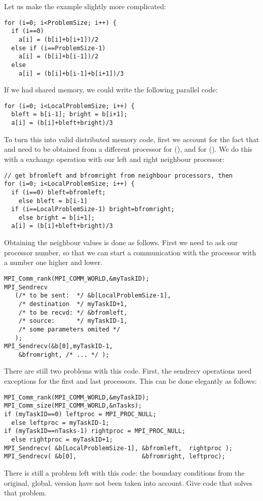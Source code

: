 Let us make the example slightly more complicated:
\begin{verbatim}
for (i=0; i<ProblemSize; i++) {
  if (i==0)
    a[i] = (b[i]+b[i+1])/2
  else if (i==ProblemSize-1)
    a[i] = (b[i]+b[i-1])/2
  else
    a[i] = (b[i]+b[i-1]+b[i+1])/3
\end{verbatim}
If we had shared memory, we could write the following parallel code:
\begin{verbatim}
for (i=0; i<LocalProblemSize; i++) {
  bleft = b[i-1]; bright = b[i+1];
  a[i] = (b[i]+bleft+bright)/3
\end{verbatim}
To turn this into valid distributed memory code,
first we account for the fact that  and  need to be
obtained from a different processor for  (), and for
 (). We do this with a exchange
operation with our left and right neighbour processor:
\begin{verbatim}
// get bfromleft and bfromright from neighbour processors, then
for (i=0; i<LocalProblemSize; i++) {
  if (i==0) bleft=bfromleft;
    else bleft = b[i-1]
  if (i==LocalProblemSize-1) bright=bfromright;
    else bright = b[i+1];
  a[i] = (b[i]+bleft+bright)/3
\end{verbatim}
Obtaining the neighbour values is done as follows. First we need to
ask our processor number, so that we can start a communication with
the processor with a number one higher and lower.
\begin{verbatim}
MPI_Comm_rank(MPI_COMM_WORLD,&myTaskID);
MPI_Sendrecv
   (/* to be sent:  */ &b[LocalProblemSize-1],
    /* destination  */ myTaskID+1,
    /* to be recvd: */ &bfromleft,
    /* source:      */ myTaskID-1, 
    /* some parameters omited */ 
   );
MPI_Sendrecv(&b[0],myTaskID-1,
    &bfromright, /* ... */ );
\end{verbatim}
There are still two problems with this code. First, the sendrecv
operations need exceptions for the first and last processors. This can
be done elegantly as follows:
\begin{verbatim}
MPI_Comm_rank(MPI_COMM_WORLD,&myTaskID);
MPI_Comm_size(MPI_COMM_WORLD,&nTasks);
if (myTaskID==0) leftproc = MPI_PROC_NULL;
  else leftproc = myTaskID-1;
if (myTaskID==nTasks-1) rightproc = MPI_PROC_NULL;
  else rightproc = myTaskID+1;
MPI_Sendrecv( &b[LocalProblemSize-1], &bfromleft,  rightproc );
MPI_Sendrecv( &b[0],                  &bfromright, leftproc);
\end{verbatim}

\begin{exercise}
  There is still a problem left with this code: the boundary
  conditions from the original, global, version have not been taken
  into account. Give code that solves that problem.
\end{exercise}

